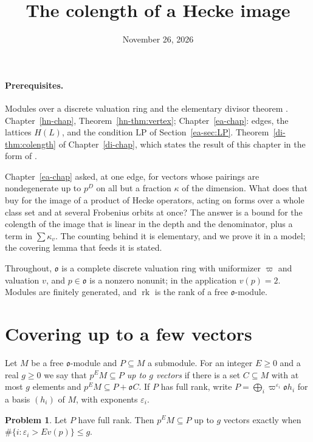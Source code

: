 \documentclass[reqno]{amsart}
\title{The colength of a Hecke image}
\author{}
\date{November 26, 2026}
\newcounter{chap}
\theoremstyle{definition}
\newtheorem{problem}{Problem}[section]
\theoremstyle{plain}
\theoremstyle{remark}
\newcommand{\LP}{\mathrm{LP}}
\newcommand{\rk}{\operatorname{rk}}
\newcommand{\vo}{\mathfrak o}
\begin{document}
\maketitle
{}\label{chap}

\paragraph{Prerequisites.}
Modules over a discrete valuation ring and the elementary divisor theorem \cite[Ch.~III, \S7]{La}.  Chapter~\ref{hn-chap}, Theorem~\ref{hn-thm:vertex}; Chapter~\ref{ea-chap}: edges, the lattices \(H(L)\), and the condition \(\LP\) of Section~\ref{ea-sec:LP}.  Theorem~\ref{di-thm:colength} of Chapter~\ref{di-chap}, which states the result of this chapter in the form of \cite[Thm.~12.18]{Adr}.

Chapter~\ref{ea-chap} asked, at one edge, for vectors whose pairings are nondegenerate up to \(p^D\) on all but a fraction \(\kappa\) of the dimension.  What does that buy for the image of a product of Hecke operators, acting on forms over a whole class set and at several Frobenius orbits at once?  The answer is a bound for the colength of the image that is linear in the depth and the denominator, plus a term in \(\sum\kappa_v\).  The counting behind it is elementary, and we prove it in a model; the covering lemma that feeds it is stated.

Throughout, \(\vo\) is a complete discrete valuation ring with uniformizer \(\varpi\) and valuation \(v\), and \(p\in\vo\) is a nonzero nonunit; in the application \(v(p)=2\).  Modules are finitely generated, and \(\rk\) is the rank of a free \(\vo\)-module.

\section{Covering up to a few vectors}\label{sec:cover}

Let \(M\) be a free \(\vo\)-module and \(P\subseteq M\) a submodule.  For an integer \(E\ge0\) and a real \(g\ge0\) we say that \emph{\(p^EM\subseteq P\) up to \(g\) vectors} if there is a set \(C\subseteq M\) with at most \(g\) elements and \(p^EM\subseteq P+\vo C\).  If \(P\) has full rank, write \(P=\bigoplus_i\varpi^{\varepsilon_i}\vo h_i\) for a basis \((h_i)\) of \(M\), with exponents \(\varepsilon_i\).

\begin{problem}\label{pr:cover-smith}
Let \(P\) have full rank.  Then \(p^EM\subseteq P\) up to \(g\) vectors exactly when \(\#\{i:\varepsilon_i>Ev(p)\}\le g\).
\end{problem}
\end{document}
